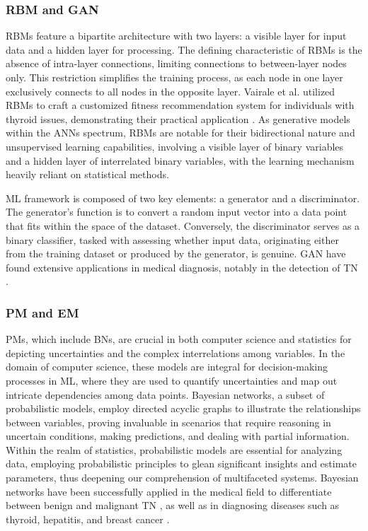 \documentclass[a4paper,fleqn]{cas-sc}
\begin{document}
\vskip2mm

\subsubsection{RBM and GAN}


\Acp{RBM} feature a bipartite architecture with two layers: a visible layer for input data and a hidden layer for processing. The defining characteristic of \acp{RBM} is the absence of intra-layer connections, limiting connections to between-layer nodes only. This restriction simplifies the training process, as each node in one layer exclusively connects to all nodes in the opposite layer. Vairale et al. utilized \acp{RBM} to craft a customized fitness recommendation system for individuals with thyroid issues, demonstrating their practical application \cite{vairalephysical}. As generative models within the \acp{ANN} spectrum, \acp{RBM} are notable for their bidirectional nature and unsupervised learning capabilities, involving a visible layer of binary variables and a hidden layer of interrelated binary variables, with the learning mechanism heavily reliant on statistical methods.






\ac{ML} framework is composed of two key elements: a generator and a discriminator. The generator's function is to convert a random input vector into a data point that fits within the space of the dataset. Conversely, the discriminator serves as a binary classifier, tasked with assessing whether input data, originating either from the training dataset or produced by the generator, is genuine. \ac{GAN} have found extensive applications in medical diagnosis, notably in the detection of \ac{TN} \cite{yang2019dscgans, yoo2020generative}.

\subsubsection{PM and EM}

\vskip2mm

\acp{PM}, which include \acp{BN}, are crucial in both computer science and statistics for depicting uncertainties and the complex interrelations among variables. In the domain of computer science, these models are integral for decision-making processes in \ac{ML}, where they are used to quantify uncertainties and map out intricate dependencies among data points. Bayesian networks, a subset of probabilistic models, employ directed acyclic graphs to illustrate the relationships between variables, proving invaluable in scenarios that require reasoning in uncertain conditions, making predictions, and dealing with partial information. Within the realm of statistics, probabilistic models are essential for analyzing data, employing probabilistic principles to glean significant insights and estimate parameters, thus deepening our comprehension of multifaceted systems. Bayesian networks have been successfully applied in the medical field to differentiate between benign and malignant \ac{TN} \cite{liu2011bayesian, liu2009controlled}, as well as in diagnosing diseases such as thyroid, hepatitis, and breast cancer \cite{ashraf2012hybrid}.
\end{document}
